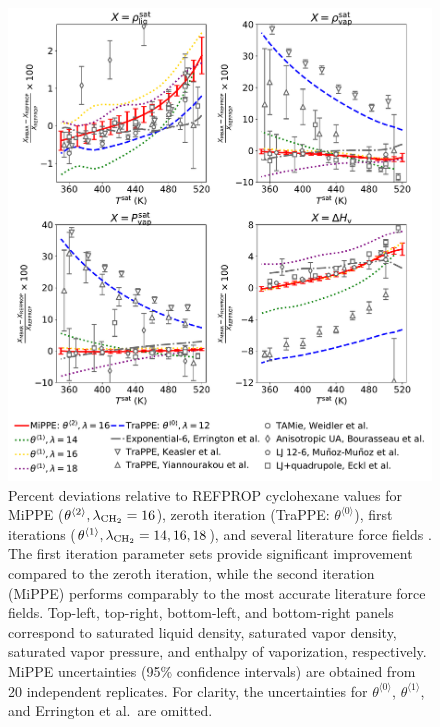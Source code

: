 \documentclass[journal=jced,manuscript=article]{achemso}
\begin{document}

	\begin{figure}[H]
		\centering
		\includegraphics[width=5.8in]{CYC6_deviations_iterations.pdf}
		\caption{Percent deviations relative to REFPROP cyclohexane values\cite{Zhou2014} for MiPPE ($\theta^{\langle2\rangle}, \lambda_{\rm CH_2} = 16$), zeroth iteration (TraPPE: $\theta^{\langle0\rangle}$), first iterations ($\theta^{\langle1\rangle}, \lambda_{\rm CH_2} = 14, 16, 18$), and several literature force fields \cite{Errington1999,Eckl2008,Bourasseau2002CYC6,Mauricio2015,Keasler2012,Yiannourakou2019,Weidler2016}. The first iteration parameter sets provide significant improvement compared to the zeroth iteration, while the second iteration (MiPPE) performs comparably to the most accurate literature force fields. Top-left, top-right, bottom-left, and bottom-right panels correspond to saturated liquid density, saturated vapor density, saturated vapor pressure, and enthalpy of vaporization, respectively. MiPPE uncertainties (95\% confidence intervals) are obtained from 20 independent replicates. For clarity, the uncertainties for $\theta^{\langle0\rangle}$, $\theta^{\langle1\rangle}$, and Errington et al.~\cite{Errington1999}are omitted.}
		\label{fig: VLE cyclohexane}
	\end{figure}
\end{document}
